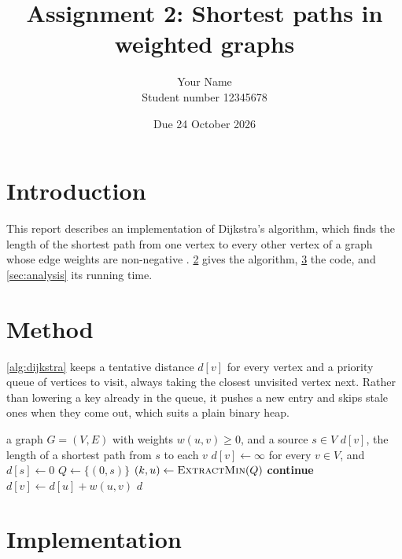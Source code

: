 \documentclass[11pt,a4paper]{article}   %
\title{Assignment 2: Shortest paths in weighted graphs}
\author{Your Name\\ Student number 12345678}
\date{Due 24 October 2026}
\begin{document}
\maketitle

\section{Introduction}

This report describes an implementation of Dijkstra's algorithm, which finds the length of the
shortest path from one vertex to every other vertex of a graph whose edge weights are
non-negative \parencite{Dijkstra1959}. \cref{sec:method} gives the algorithm, \cref{sec:code} the code, and
\cref{sec:analysis} its running time.

\section{Method}\label{sec:method}

\cref{alg:dijkstra} keeps a tentative distance $d[v]$ for every vertex and a
priority queue of vertices to visit, always taking the closest unvisited vertex next. Rather than
lowering a key already in the queue, it pushes a new entry and skips stale ones when they come out,
which suits a plain binary heap.

\begin{algorithm}[ht]
  \caption{Dijkstra's algorithm with a binary heap}
  \label{alg:dijkstra}
  \begin{algorithmic}[1]
    \Require a graph $G = (V, E)$ with weights $w(u, v) \ge 0$, and a source $s \in V$
    \Ensure $d[v]$, the length of a shortest path from $s$ to each $v$
    \State $d[v] \gets \infty$ for every $v \in V$, and $d[s] \gets 0$
    \State $Q \gets \{(0, s)\}$ 
      \State $(k, u) \gets \Call{ExtractMin}{Q}$
        \State \textbf{continue} 
      \EndIf
          \State $d[v] \gets d[u] + w(u, v)$
          \State {}
        \EndIf
      \EndFor
    \EndWhile
    \State \Return $d$
  \end{algorithmic}
\end{algorithm}

\section{Implementation}\label{sec:code}
\end{document}

